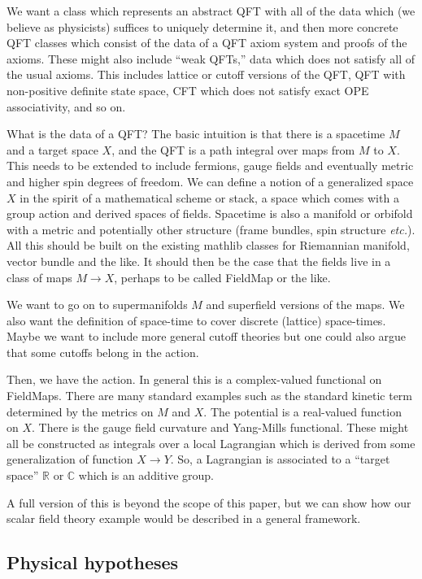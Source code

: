 \documentclass{article}
\newcommand{\1}{\mathbbm{1}}
\theoremstyle{plain}
\theoremstyle{definition}
\numberwithin{equation}{section}
\def\IC{\mathbb{C}}
\def\IR{\mathbb{R}}
\begin{document}
We want a class which represents an abstract QFT with all of the data which (we believe as physicists) suffices to uniquely determine it,
and then more concrete QFT classes which consist of the data of a QFT axiom system and proofs of the axioms.  These might also include ``weak QFTs,''
data which does not satisfy all of the usual axioms.  This includes lattice or cutoff versions of the QFT, QFT with non-positive definite state space,
CFT which does not satisfy exact OPE associativity, and so on.

What is the data of a QFT?  The basic intuition is that there is a spacetime $M$ and a target space $X$, and the QFT is a path integral
over maps from $M$ to $X$.  This needs to be extended to include fermions, gauge fields and eventually metric and higher spin degrees of freedom.
We can define a notion of a generalized space $X$ in the spirit of a mathematical scheme or stack, a space which comes with a group action
and derived spaces of fields.  Spacetime is also a manifold or orbifold with a metric and potentially other structure (frame bundles, spin structure {\it etc.}).
All this should be built on the existing mathlib classes for Riemannian manifold, vector bundle and the like.
It should then be the case that the fields live in a class of maps $M\rightarrow X$, perhaps to be called FieldMap or the like.

We want to go on to supermanifolds $M$ and superfield versions of the maps.  We also want the definition of space-time to cover
discrete (lattice) space-times.  Maybe we want to include more general cutoff theories but one could also argue that some cutoffs belong in the action.

Then, we have the action.  In general this is a complex-valued functional on FieldMaps.  There are many standard examples such as the
standard kinetic term determined by the metrics on $M$ and $X$.  The potential is a real-valued function on $X$.  There is the gauge field curvature
and Yang-Mills functional.  These might all be constructed as integrals over a local Lagrangian which is derived from some generalization of function $X\rightarrow Y$.
So, a Lagrangian is associated to a ``target space'' $\IR$ or $\IC$ which is an additive group.

A full version of this is beyond the scope of this paper, but we can show how our scalar field theory example would be described in a general framework.

\subsection{Physical hypotheses}
\end{document}
